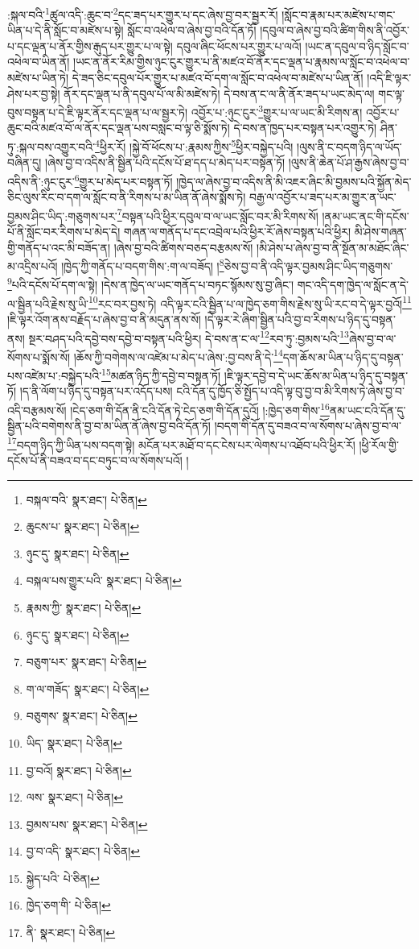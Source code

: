 :སྐལ་བའི་\footnote{བསྐལ་བའི་  སྣར་ཐང་།  པེ་ཅིན། }ཚུལ་འདི་:ཆུང་བ་\footnote{ཆུངས་པ་  སྣར་ཐང་།  པེ་ཅིན། }དང་ཟད་པར་གྱུར་པ་དང་ཞེས་བྱ་བར་སྦྱར་རོ། །སློང་བ་རྣམ་པར་མཛེས་པ་གང་ཡིན་པ་དེ་ནི་སློང་བ་མཛེས་པ་སྟེ། སློང་བ་འཕེལ་བ་ཞེས་བྱ་བའི་དོན་ཏོ། །དབུལ་བ་ཞེས་བྱ་བའི་ཚིག་གིས་ནི་འབྱོར་པ་དང་ལྡན་པ་ནོར་གྱིས་རྒུད་པར་གྱུར་པ་ལ་སྟེ། དབུལ་ཞིང་ཕོངས་པར་གྱུར་པ་ལའོ། །ཡང་ན་དབུལ་བ་ཉིད་སློང་བ་འཕེལ་བ་ཡིན་ནོ། །ཡང་ན་ནོར་རིམ་གྱིས་ཉུང་ངུར་གྱུར་པ་ནི་མཛའ་བོ་ནོར་དང་ལྡན་པ་རྣམས་ལ་སློང་བ་འཕེལ་བ་མཛེས་པ་ཡིན་ཏེ། དེ་ཟད་ཅིང་དབུལ་པོར་གྱུར་པ་མཛའ་བོ་དག་ལ་སློང་བ་འཕེལ་བ་མཛེས་པ་ཡིན་ནོ། །འདི་ཇི་ལྟར་ཤེས་པར་བྱ་སྟེ། ནོར་དང་ལྡན་པ་ནི་དབུལ་པོ་ལ་མི་མཛེས་ཏེ། དེ་བས་ན་ང་ལ་ནི་ནོར་ཟད་པ་ཡང་མེད་ལ། གང་ལྟ་བུས་བསྟན་པ་དེ་ཇི་ལྟར་ནོར་དང་ལྡན་པ་ལ་སྦྱར་ཏེ། འབྱོར་པ་:ཉུང་ངུར་\footnote{ཉུང་དུ་  སྣར་ཐང་།  པེ་ཅིན། }གྱུར་པ་ལ་ཡང་མི་རིགས་ན། འབྱོར་པ་ཆུང་བའི་མཛའ་བོ་ལ་ནོར་དང་ལྡན་པས་བསླང་བ་ལྟ་ཅི་སྨོས་ཏེ། དེ་བས་ན་ཁྱད་པར་བསྟན་པར་འགྱུར་ཏེ། ཤིན་ཏུ་:སྐལ་བས་འགྱུར་བའི་\footnote{བསྐལ་པས་གྱུར་པའི་  སྣར་ཐང་།  པེ་ཅིན། }ཕྱིར་རོ། །སྐྱེ་བོ་ཕོངས་པ་:རྣམས་ཀྱིས་\footnote{རྣམས་ཀྱི་  སྣར་ཐང་།  པེ་ཅིན། }ཕྱིར་བསྐྱེད་པའི། །ལུས་ནི་ང་བདག་ཉིད་ལ་ཡོད་བཞིན་དུ། །ཞེས་བྱ་བ་འདིས་ནི་སྦྱིན་པའི་དངོས་པོ་ཐ་དད་པ་མེད་པར་བསྟན་ཏོ། །ལུས་ནི་ཆེན་པོ་ཤ་རྒྱས་ཞེས་བྱ་བ་འདིས་ནི་:ཉུང་ངུར་\footnote{ཉུང་དུ་  སྣར་ཐང་།  པེ་ཅིན། }གྱུར་པ་མེད་པར་བསྟན་ཏོ། །ཁྱེད་ལ་ཞེས་བྱ་བ་འདིས་ནི་མི་འཇར་ཞིང་མི་བྱམས་པའི་སྐྱོན་མེད་ཅིང་ལུས་རིང་བ་དག་ལ་སློང་བ་ནི་རིགས་པ་མ་ཡིན་ནོ་ཞེས་སྨོས་ཏེ། བརྒྱ་ལ་འབྱོར་པ་ཟད་པར་མ་གྱུར་ན་ཡང་བྱམས་ཤིང་ཡིད་:གཅུགས་པར་\footnote{བཅུག་པར་  སྣར་ཐང་།  པེ་ཅིན། }བསྟན་པའི་ཕྱིར་དབུལ་བ་ལ་ཡང་སློང་བར་མི་རིགས་སོ། །ནམ་ཡང་ནང་གི་དངོས་པོ་ནི་སློང་བར་རིགས་པ་མེད་དེ། གཞན་ལ་གནོད་པ་དང་འབྲེལ་པའི་ཕྱིར་རོ་ཞེས་བསྟན་པའི་ཕྱིར། མི་ཤེས་གཞན་གྱི་གནོད་པ་འང་མི་བཟོད་ན། །ཞེས་བྱ་བའི་ཚིགས་བཅད་བརྩམས་སོ། །མི་ཤེས་པ་ཞེས་བྱ་བ་ནི་སྔོན་མ་མཐོང་ཞིང་མ་འདྲིས་པའོ། །ཁྱེད་ཀྱི་གནོད་པ་བདག་གིས་:ག་ལ་བཟོད། །\footnote{ག་ལ་གཟོད་  སྣར་ཐང་།  པེ་ཅིན། }ཅེས་བྱ་བ་ནི་འདི་ལྟར་བྱམས་ཤིང་ཡིད་གཅུགས་\footnote{བཅུགས་  སྣར་ཐང་།  པེ་ཅིན། }པའི་དངོས་པོ་དག་ལ་སྟེ། །དེས་ན་ཁྱེད་ལ་ཡང་གནོད་པ་བཏང་སྙོམས་སུ་བྱ་ཞིང་། གང་འདི་དག་ཁྱེད་ལ་སློང་ན་དེ་ལ་སྦྱིན་པའི་རྗེས་སུ་ཡི་\footnote{ཡིད་  སྣར་ཐང་།  པེ་ཅིན། }རང་བར་བྱས་ཏེ། འདི་ལྟར་ངའི་སྦྱིན་པ་ལ་ཁྱེད་ཅག་གིས་རྗེས་སུ་ཡི་རང་བ་དེ་ལྟར་བྱའོ།\footnote{བྱ་བའོ།  སྣར་ཐང་།  པེ་ཅིན། } །ཇི་ལྟར་འོག་ནས་བརྗོད་པ་ཞེས་བྱ་བ་ནི་མདུན་ནས་སོ། །དེ་ལྟར་རེ་ཞིག་སྦྱིན་པའི་བྱ་བ་རིགས་པ་ཉིད་དུ་བསྟན་ནས། སྔར་བཤད་པའི་དབྱེ་བས་དབྱེ་བ་བསྟན་པའི་ཕྱིར། དེ་བས་ན་ང་ལ་\footnote{ལས་  སྣར་ཐང་།  པེ་ཅིན། }རབ་ཏུ་:བྱམས་པའི་\footnote{བྱམས་པས་  སྣར་ཐང་།  པེ་ཅིན། }ཞེས་བྱ་བ་ལ་སོགས་པ་སྨོས་སོ། །ཆོས་ཀྱི་བགེགས་ལ་འཛེམ་པ་མེད་པ་ཞེས་:བྱ་བས་ནི་དེ་\footnote{བྱ་བ་འདི་  སྣར་ཐང་།  པེ་ཅིན། }དག་ཆོས་མ་ཡིན་པ་ཉིད་དུ་བསྟན་པས་འཛེམ་པ་:བསྐྱེད་པའི་\footnote{སྐྱེད་པའི་  པེ་ཅིན། }མཚན་ཉིད་ཀྱི་དབྱེ་བ་བསྟན་ཏོ། །ཇི་ལྟར་དབྱེ་བ་དེ་ཡང་ཆོས་མ་ཡིན་པ་ཉིད་དུ་བསྟན་ཏོ། །ད་ནི་ལོག་པ་ཉིད་དུ་བསྟན་པར་འདོད་པས། ངའི་དོན་དུ་ཁྱོད་ཅི་སྤྱོད་པ་འདི་ལྟ་བུ་བྱ་བ་མི་རིགས་ཏེ་ཞེས་བྱ་བ་འདི་བརྩམས་སོ། །ངེད་ཅག་གི་དོན་ནི་ངའི་དོན་ཏེ་ངེད་ཅག་གི་དོན་དུའོ། །:ཁྱེད་ཅག་གིས་\footnote{ཁྱེད་ཅག་གི་  པེ་ཅིན། }ནམ་ཡང་ངའི་དོན་དུ་སྦྱིན་པའི་བགེགས་ནི་བྱ་བ་མ་ཡིན་ནོ་ཞེས་བྱ་བའི་དོན་ཏོ། །བདག་གི་དོན་དུ་བཟའ་བ་ལ་སོགས་པ་ཞེས་བྱ་བ་ལ་\footnote{ནི་  སྣར་ཐང་།  པེ་ཅིན། }བདག་ཉིད་ཀྱི་ཡིན་པས་བདག་སྟེ། མངོན་པར་མཐོ་བ་དང་ངེས་པར་ལེགས་པ་འཐོབ་པའི་ཕྱིར་རོ། །ཕྱི་རོལ་གྱི་དངོས་པོ་ནི་བཟའ་བ་དང་བཏུང་བ་ལ་སོགས་པའོ། །

